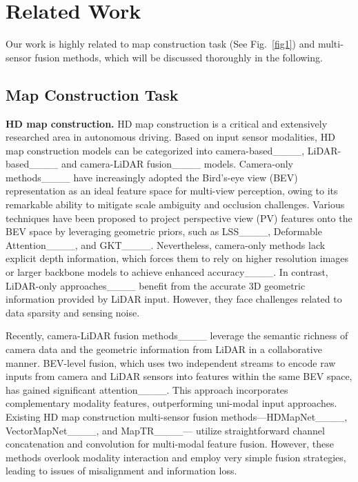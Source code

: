 \section{Related Work}
\label{sec2}
Our work is highly related to map construction task (See  Fig.~\ref{fig1}) and multi-sensor fusion methods, which will be discussed thoroughly in the following.


\subsection{Map Construction Task}
\textbf{HD map construction.}
HD map construction is a critical and extensively researched area in autonomous driving.
Based on input sensor modalities,
HD map construction models can be categorized into camera-based____, LiDAR-based____ and camera-LiDAR fusion____ models.
Camera-only methods____ have increasingly adopted the Bird's-eye view (BEV) representation as an ideal feature space for multi-view perception, owing to its remarkable ability to mitigate scale ambiguity and occlusion challenges. 
Various techniques have been proposed to project perspective view (PV) features onto the BEV space by leveraging geometric priors, such as LSS____, Deformable Attention____, and GKT____.
Nevertheless, camera-only methods lack explicit depth information, which forces them to rely on higher resolution images or larger backbone models to achieve enhanced accuracy____. 
In contrast, LiDAR-only approaches____ benefit from the accurate 3D geometric information provided by LiDAR input.
However, they face challenges related to data sparsity and sensing noise.






Recently, camera-LiDAR fusion methods____ leverage the semantic richness of camera data and the geometric information from LiDAR in a collaborative manner. 
BEV-level fusion, which uses two independent streams to encode raw inputs from camera and LiDAR sensors into features within the same BEV space, has gained significant attention____.
This approach incorporates complementary modality features, outperforming uni-modal input approaches.
Existing HD map construction multi-sensor fusion methods—HDMapNet____, VectorMapNet____, and MapTR____— utilize straightforward channel concatenation and convolution for multi-modal feature fusion. 
However, these methods overlook modality interaction and employ very simple fusion strategies, leading to issues of misalignment and information loss.




